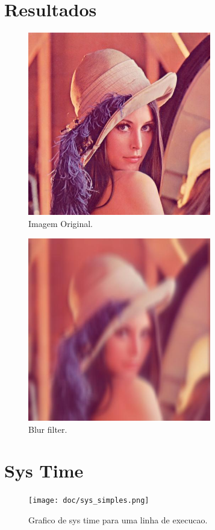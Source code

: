 \documentclass[12pt]{article}
\begin{document}
\maketitle

\section{Resultados}
     \begin{figure}[H]
        \caption{Imagem Original.}
        \centering
        \includegraphics[width=8cm]{data/lena.jpg}
    \end{figure}
    \begin{figure}[H]
        \caption{Blur filter.}
        \centering
        \includegraphics[width=8cm]{data/out.jpg}
    \end{figure}

\section{Sys Time}
    \begin{figure}[H]
        \caption{Grafico de sys time para uma linha de execucao.}
        \centering
        \texttt{[image: doc/sys\_simples.png]}
    \end{figure}
\end{document}
